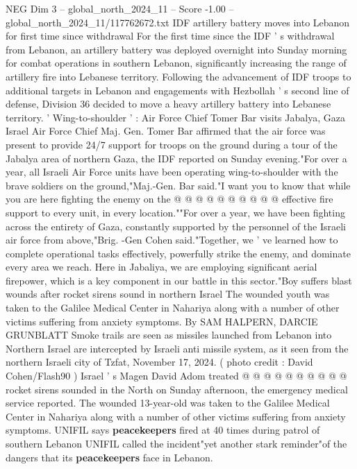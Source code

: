 \begin{textsample}{NEG Dim 3 – global\_north\_2024\_11 – Score -1.00 – global\_north\_2024\_11/117762672.txt}  \label{ex:f3_neg_288}
IDF artillery battery moves into Lebanon for first time since withdrawal For the first time since the IDF ' s withdrawal from Lebanon, an artillery battery was deployed overnight into Sunday morning for combat operations in southern Lebanon, significantly increasing the range of artillery fire into Lebanese territory.
Following the advancement of IDF troops to additional targets in Lebanon and engagements with Hezbollah ' s second line of defense, Division 36 decided to move a heavy artillery battery into Lebanese territory. ' Wing-to-shoulder ' : Air Force Chief Tomer Bar visits Jabalya, Gaza Israel Air Force Chief Maj.
Gen.
Tomer Bar affirmed that the air force was present to provide 24/7 support for troops on the ground during a tour of the Jabalya area of northern Gaza, the IDF reported on Sunday evening."For over a year, all Israeli Air Force units have been operating wing-to-shoulder with the brave soldiers on the ground,"Maj.-Gen.
Bar said."I want you to know that while you are here fighting the enemy on the @ @ @ @ @ @ @ @ @ @ effective fire support to every unit, in every location.""For over a year, we have been fighting across the entirety of Gaza, constantly supported by the personnel of the Israeli air force from above,"Brig. -Gen Cohen said."Together, we ' ve learned how to complete operational tasks effectively, powerfully strike the enemy, and dominate every area we reach.
Here in Jabaliya, we are employing significant aerial firepower, which is a key component in our battle in this sector."Boy suffers blast wounds after rocket sirens sound in northern Israel The wounded youth was taken to the Galilee Medical Center in Nahariya along with a number of other victims suffering from anxiety symptoms.
By SAM HALPERN, DARCIE GRUNBLATT Smoke trails are seen as missiles launched from Lebanon into Northern Israel are intercepted by Israeli anti missile system, as it seen from the northern Israeli city of Tzfat, November 17, 2024. ( photo credit : David Cohen/Flash90 ) Israel ' s Magen David Adom treated @ @ @ @ @ @ @ @ @ @ rocket sirens sounded in the North on Sunday afternoon, the emergency medical service reported.
The wounded 13-year-old was taken to the Galilee Medical Center in Nahariya along with a number of other victims suffering from anxiety symptoms.
UNIFIL says \textbf{peacekeepers} fired at 40 times during patrol of southern Lebanon UNIFIL called the incident"yet another stark reminder"of the dangers that its \textbf{peacekeepers} face in Lebanon.

\end{textsample}
